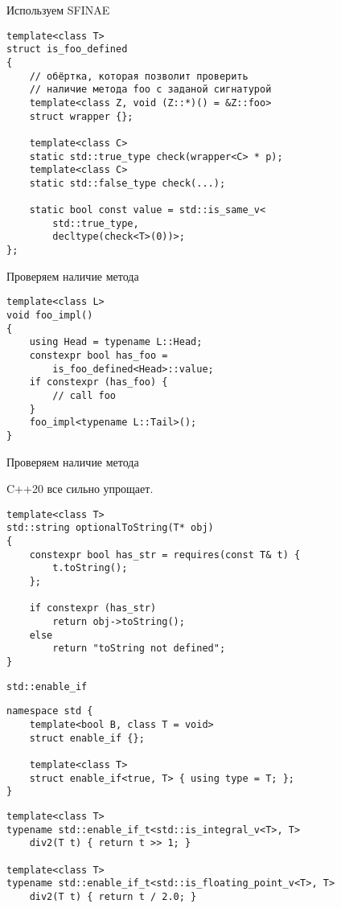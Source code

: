 \documentclass{beamer}
\begin{document}
\begin{frame}[fragile]{Используем SFINAE}
\begin{lstlisting}
template<class T>
struct is_foo_defined
{
    // обёртка, которая позволит проверить
    // наличие метода foo с заданой сигнатурой
    template<class Z, void (Z::*)() = &Z::foo>
    struct wrapper {};

    template<class C>
    static std::true_type check(wrapper<C> * p);
    template<class C>
    static std::false_type check(...);

    static bool const value = std::is_same_v<
        std::true_type,
        decltype(check<T>(0))>;
};
\end{lstlisting}
\end{frame}

\begin{frame}[fragile]{Проверяем наличие метода}

\begin{lstlisting}
template<class L> 
void foo_impl() 
{
    using Head = typename L::Head;
    constexpr bool has_foo = 
        is_foo_defined<Head>::value;
    if constexpr (has_foo) {
        // call foo
    }
    foo_impl<typename L::Tail>();
}
\end{lstlisting}
\end{frame}

\begin{frame}[fragile]{Проверяем наличие метода}

C++20 все сильно упрощает.

\begin{lstlisting}
template<class T>
std::string optionalToString(T* obj)
{
    constexpr bool has_str = requires(const T& t) {
        t.toString();
    };

    if constexpr (has_str)
        return obj->toString();
    else
        return "toString not defined";
}
\end{lstlisting}
\end{frame}

\begin{frame}[fragile]{{\tt std::enable\_if}}
\begin{lstlisting}
namespace std {
    template<bool B, class T = void> 
    struct enable_if {};

    template<class T>
    struct enable_if<true, T> { using type = T; };
}
\end{lstlisting}
\begin{lstlisting}
template<class T>
typename std::enable_if_t<std::is_integral_v<T>, T>
    div2(T t) { return t >> 1; }

template<class T>
typename std::enable_if_t<std::is_floating_point_v<T>, T>
    div2(T t) { return t / 2.0; }
\end{lstlisting}
\end{frame}
\end{document}
